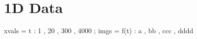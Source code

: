 \documentclass[12pt]{article}
\begin{document}


\section{1D Data}

\begin{functable}
    xvals =    t : 1 , 20 , 300 , 4000 ;
    imgs  = f(t) : a , bb , ccc , dddd
\end{functable}


\end{document}
